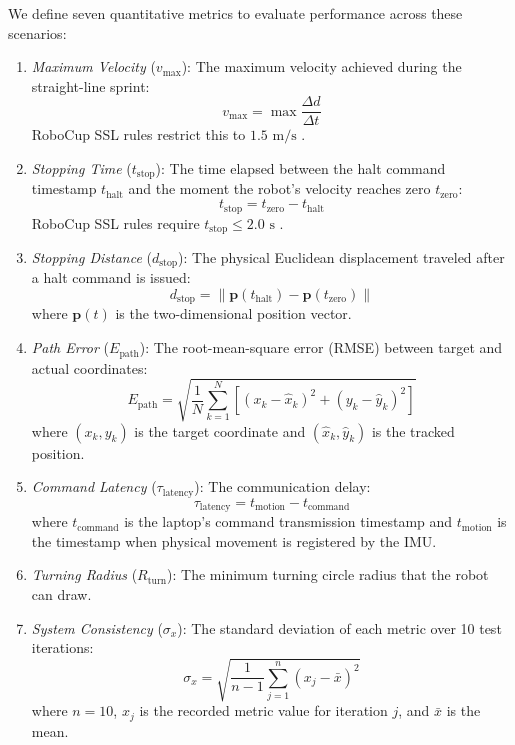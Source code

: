 \documentclass[a4paper,twoside,12pt]{report}
\begin{document}
We define seven quantitative metrics to evaluate performance across these scenarios:
\begin{enumerate}
\item \textit{Maximum Velocity} ($v_{\text{max}}$): The maximum velocity achieved during the straight-line sprint:
  \begin{equation}
  v_{\text{max}} = \max \frac{\Delta d}{\Delta t}
  \end{equation}
  RoboCup SSL rules restrict this to $1.5\text{ m/s}$ \citep{ssl_rules_2026}.
\item \textit{Stopping Time} ($t_{\text{stop}}$): The time elapsed between the halt command timestamp $t_{\text{halt}}$ and the moment the robot's velocity reaches zero $t_{\text{zero}}$:
  \begin{equation}
  t_{\text{stop}} = t_{\text{zero}} - t_{\text{halt}}
  \end{equation}
  RoboCup SSL rules require $t_{\text{stop}} \le 2.0\text{ s}$ \citep{ssl_rules_2026}.
\item \textit{Stopping Distance} ($d_{\text{stop}}$): The physical Euclidean displacement traveled after a halt command is issued:
  \begin{equation}
  d_{\text{stop}} = \|\mathbf{p}(t_{\text{halt}}) - \mathbf{p}(t_{\text{zero}})\|
  \end{equation}
  where $\mathbf{p}(t)$ is the two-dimensional position vector.
\item \textit{Path Error} ($E_{\text{path}}$): The root-mean-square error (RMSE) between target and actual coordinates:
  \begin{equation}
  E_{\text{path}} = \sqrt{\frac{1}{N} \sum_{k=1}^{N} \left[ (x_k - \hat{x}_k)^2 + (y_k - \hat{y}_k)^2 \right]}
  \end{equation}
  where $(x_k, y_k)$ is the target coordinate and $(\hat{x}_k, \hat{y}_k)$ is the tracked position.
\item \textit{Command Latency} ($\tau_{\text{latency}}$): The communication delay:
  \begin{equation}
  \tau_{\text{latency}} = t_{\text{motion}} - t_{\text{command}}
  \end{equation}
  where $t_{\text{command}}$ is the laptop's command transmission timestamp and $t_{\text{motion}}$ is the timestamp when physical movement is registered by the IMU.
\item \textit{Turning Radius} ($R_{\text{turn}}$): The minimum turning circle radius that the robot can draw.
\item \textit{System Consistency} ($\sigma_x$): The standard deviation of each metric over 10 test iterations:
  \begin{equation}
  \sigma_x = \sqrt{\frac{1}{n-1} \sum_{j=1}^{n} (x_j - \bar{x})^2}
  \end{equation}
  where $n = 10$, $x_j$ is the recorded metric value for iteration $j$, and $\bar{x}$ is the mean.
\end{enumerate}
\end{document}
